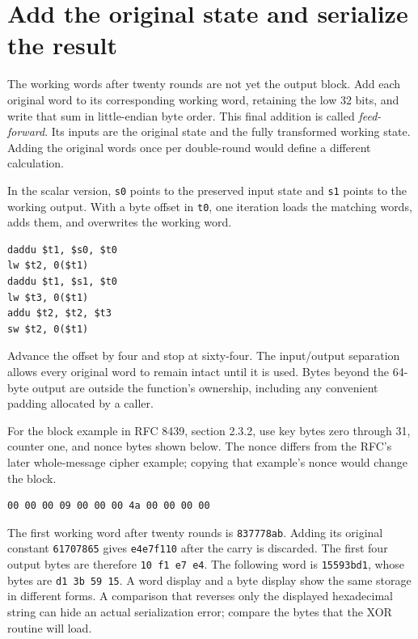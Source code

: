 \section{Add the original state and serialize the result}
The working words after twenty rounds are not yet the output block. Add each
original word to its corresponding working word, retaining the low 32 bits, and
write that sum in little-endian byte order. This final addition is called
\emph{feed-forward}. Its inputs are the original state and the fully transformed
working state. Adding the original words once per double-round would define a
different calculation.

In the scalar version, \texttt{s0} points to the preserved input state and
\texttt{s1} points to the working output. With a byte offset in \texttt{t0}, one
iteration loads the matching words, adds them, and overwrites the working word.
\begin{verbatim}
daddu $t1, $s0, $t0
lw $t2, 0($t1)
daddu $t1, $s1, $t0
lw $t3, 0($t1)
addu $t2, $t2, $t3
sw $t2, 0($t1)
\end{verbatim}

Advance the offset by four and stop at sixty-four. The input/output separation
allows every original word to remain intact until it is used. Bytes beyond the
64-byte output are outside the function's ownership, including any convenient
padding allocated by a caller.

For the block example in RFC 8439, section 2.3.2, use key bytes zero through 31,
counter one, and nonce bytes shown below. The nonce differs from the RFC's later
whole-message cipher example; copying that example's nonce would change the block.
\begin{verbatim}
00 00 00 09 00 00 00 4a 00 00 00 00
\end{verbatim}
The first working word after twenty rounds is \texttt{837778ab}. Adding its original
constant \texttt{61707865} gives \texttt{e4e7f110} after the carry is discarded.
The first four output bytes are therefore \texttt{10 f1 e7 e4}. The following word
is \texttt{15593bd1}, whose bytes are \texttt{d1 3b 59 15}. A word display and a
byte display show the same storage in different forms. A comparison that reverses
only the displayed hexadecimal string can hide an actual serialization error;
compare the bytes that the XOR routine will load.
